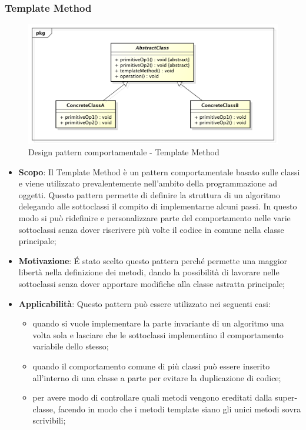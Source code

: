 		\subsubsection{Template Method} %
		\label{ssub:template_method}
		\begin{figure}[htbp]
			\centering
			\centerline{\includegraphics[scale=0.5]{./images/designpatternappendice/template_method.pdf}}
			\caption{Design pattern comportamentale - Template Method}
		\end{figure}
		\begin{itemize}
			\item \textbf{Scopo}: Il Template Method è un pattern comportamentale basato sulle classi e viene utilizzato prevalentemente nell'ambito della programmazione ad oggetti.
Questo pattern permette di definire la struttura di un algoritmo delegando alle sottoclassi il compito di implementarne alcuni passi. In questo modo si può ridefinire e personalizzare parte del comportamento nelle varie sottoclassi senza dover riscrivere più volte il codice in comune nella classe principale;
			\item \textbf{Motivazione}: \'E stato scelto questo pattern perché permette una maggior libertà nella definizione dei metodi, dando la possibilità di lavorare nelle sottoclassi senza dover apportare modifiche alla classe astratta principale;
			\item \textbf{Applicabilità}: Questo pattern può essere utilizzato nei seguenti casi:
			\begin{itemize}
			\item quando si vuole implementare la parte invariante di un algoritmo una volta sola e lasciare che le sottoclassi implementino il comportamento variabile dello stesso;
			\item quando il comportamento comune di più classi può essere inserito all'interno di una classe a parte per evitare la duplicazione di codice;
			\item per avere modo di controllare quali metodi vengono ereditati dalla super-classe, facendo in modo che i metodi template siano gli unici metodi sovra scrivibili;
			\end{itemize}

		\end{itemize}



